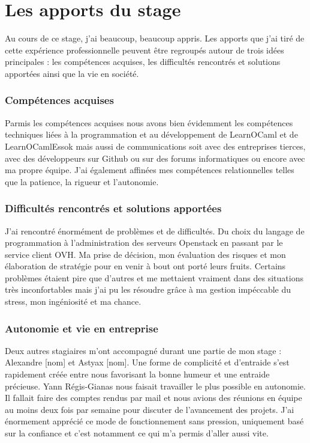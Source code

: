 \documentclass{article}
\begin{document}
\newpage

\section{Les apports du stage}
Au cours de ce stage, j’ai beaucoup, beaucoup appris. Les apports que j’ai tiré de cette expérience professionnelle peuvent être regroupés autour de trois idées principales : les compétences acquises, les difficultés rencontrés et solutions apportées ainsi que la vie en société.
\subsubsection{Compétences acquises}

Parmis les compétences acquises nous avons bien évidemment les compétences techniques liées à la programmation et au développement de LearnOCaml et de LearnOCamlEssok mais aussi de communications soit avec des entreprises tierces, avec des développeurs sur Github ou sur des forums informatiques ou encore avec ma propre équipe.
\newline
J'ai également affinées mes compétences relationnelles telles que la patience, la rigueur et l'autonomie.

\subsubsection{Difficultés rencontrés et solutions apportées}

J'ai rencontré énormément de problèmes et de difficultés. Du choix du langage de programmation à l'administration des serveurs Openstack en passant par le service client OVH.
\newline
Ma prise de décision, mon évaluation des risques et mon élaboration de stratégie pour en venir à bout ont porté leurs fruits. Certains problèmes étaient pire que d'autres et me mettaient vraiment dans des situations très inconfortables mais j'ai pu les résoudre grâce à ma gestion impéccable du stress, mon ingéniosité et ma chance.

\subsubsection{Autonomie et vie en entreprise}

Deux autres stagiaires m'ont accompagné durant une partie de mon stage : Alexandre [nom] et Astyax [nom].
\newline
Une forme de complicité et d'entraide s'est rapidement créée entre nous favorisant la bonne humeur et une entraide précieuse.
\newline
Yann Régis-Gianas nous faisait travailler le plus possible en autonomie. Il fallait faire des comptes rendus par mail et nous avions des réunions en équipe au moins deux fois par semaine pour discuter de l'avancement des projets.
\newline
J'ai énormement apprécié ce mode de fonctionnement sans pression, uniquement basé sur la confiance et c'est notamment ce qui m'a permis d'aller aussi vite.
\end{document}
